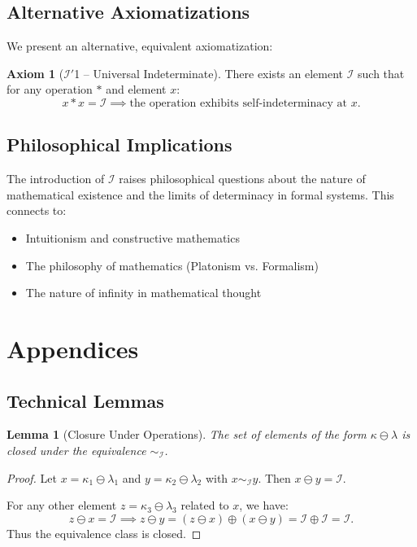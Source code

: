 \documentclass[12pt,a4paper]{article}
\newtheorem{lemma}[theorem]{Lemma}
\theoremstyle{definition}
\newtheorem{axiom}[theorem]{Axiom}
\theoremstyle{remark}
\begin{document}
\subsection{Alternative Axiomatizations}

We present an alternative, equivalent axiomatization:

\begin{axiom}[$\mathcal{I}'$1 -- Universal Indeterminate]
There exists an element $\mathcal{I}$ such that for any operation $*$ and element $x$:
\[
x * x = \mathcal{I} \implies \text{the operation exhibits self-indeterminacy at } x.
\]
\end{axiom}

\subsection{Philosophical Implications}

The introduction of $\mathcal{I}$ raises philosophical questions about the nature of mathematical existence and the limits of determinacy in formal systems. This connects to:
\begin{itemize}
\item Intuitionism and constructive mathematics
\item The philosophy of mathematics (Platonism vs. Formalism)
\item The nature of infinity in mathematical thought
\end{itemize}

\section{Appendices}

\subsection{Technical Lemmas}

\begin{lemma}[Closure Under Operations]
The set of elements of the form $\kappa \ominus \lambda$ is closed under the equivalence $\sim_{\mathcal{I}}$.
\end{lemma}

\begin{proof}
Let $x = \kappa_1 \ominus \lambda_1$ and $y = \kappa_2 \ominus \lambda_2$ with $x \sim_{\mathcal{I}} y$. Then $x \ominus y = \mathcal{I}$.

For any other element $z = \kappa_3 \ominus \lambda_3$ related to $x$, we have:
\[
z \ominus x = \mathcal{I} \implies z \ominus y = (z \ominus x) \oplus (x \ominus y) = \mathcal{I} \oplus \mathcal{I} = \mathcal{I}.
\]
Thus the equivalence class is closed.
\end{proof}
\end{document}
